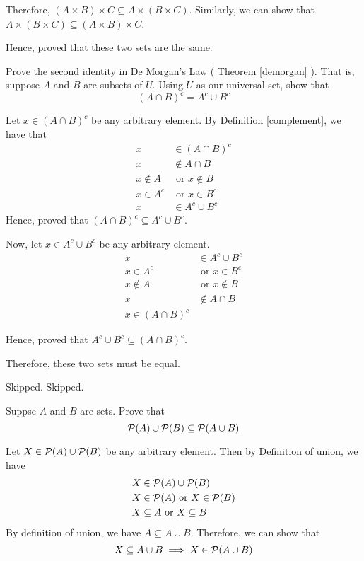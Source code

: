 	Therefore, $(A \times B) \times C \subseteq A \times (B \times C)$.
	Similarly, we can show that $A \times (B \times C) \subseteq (A \times B) \times C$.

	Hence, proved that these two sets are the same.
\es


\bp 
	Prove the second identity in De Morgan's Law ( Theorem \ref{demorgan} ).
	That is, suppose $A$ and $B$ are subsets of $U$. Using $U$ as our universal set, show that
	$$(A \cap B)^c  = A^c \cup B^c$$
\ep 

\bs
	Let $x \in (A \cap B)^c$ be any arbitrary element. By Definition \ref{complement}, we have that 
	\begin{align}
		x &\in (A \cap B)^c \\
		x &\not\in A \cap B \\
		x \not\in A &\text{ or } x \not\in B \\
		x \in A^c &\text{ or } x \in B^c \\
		x &\in A^c \cup B^c
	\end{align}
	Hence, proved that $(A \cap B)^c \subseteq A^c \cup B^c$.

	Now, let $x \in A^c \cup B^c$ be any arbitrary element.
	\begin{align}
		x &\in A^c \cup B^c \\
		x \in A^c &\text{ or } x \in B^c \\
		x \not\in A &\text{ or } x \not\in B \\
		x &\not\in A \cap B \\
		x \in (A \cap B)^c
	\end{align}

	Hence, proved that $A^c \cup B^c \subseteq (A \cap B)^c$.

	Therefore, these two sets must be equal.
\es


\bp Skipped.\ep 
\bp Skipped.\ep 

\bp  Suppse $A$ and $B$ are sets. Prove that
	$$\mathcal{P}(A) \cup \mathcal{P}(B) \subseteq \mathcal{P}(A \cup B)$$
\ep 

\bs
	Let $X \in \mathcal{P}(A) \cup \mathcal{P}(B)$ be any arbitrary element. Then by Definition of union, we have
	\begin{align}
		X &\in \mathcal{P}(A) \cup \mathcal{P}(B) \\
		X &\in \mathcal{P}(A) \text{ or } X \in \mathcal{P}(B) \\
		X &\subseteq A \text{ or } X \subseteq B
	\end{align}
	By definition of union, we have $A \subseteq A \cup B$. Therefore, we can show that 
	$$X \subseteq A \cup B \implies X \in \mathcal{P}(A \cup B)$$

